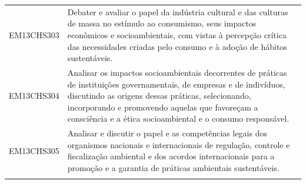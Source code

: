 \documentclass[12pt]{extarticle}
\begin{document}
\begin{longtable}{ll}
EM13CHS303 & Debater e avaliar o papel da indústria cultural e das culturas de massa no estímulo ao consumismo, seus impactos econômicos e socioambientais, com vistas à percepção crítica das necessidades criadas pelo consumo e à adoção de hábitos sustentáveis.                                                                                                                                                                                                                                                                                                                                                                                                                                                                                                                                                               \\
\rowcolor[HTML]{FFF} 
EM13CHS304 & Analisar os impactos socioambientais decorrentes de práticas de instituições governamentais, de empresas e de indivíduos, discutindo as origens dessas práticas, selecionando, incorporando e promovendo aquelas que favoreçam a consciência e a ética socioambiental e o consumo responsável.                                                                                                                                                                                                                                                                                                                                                                                                                                                                                                                        \\
\rowcolor[HTML]{E0F7FA} 
EM13CHS305 & Analisar e discutir o papel e as competências legais dos organismos nacionais e internacionais de regulação, controle e fiscalização ambiental e dos acordos internacionais para a promoção e a garantia de práticas ambientais sustentáveis.                                                                                                                                                                                                                                                                                                                                                                                                                                                                                                                                                                         \\
\rowcolor[HTML]{FFF} 

\end{longtable}
\end{document}
